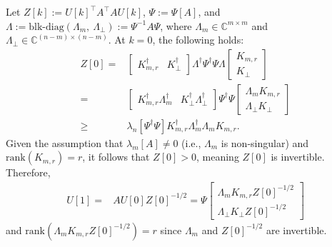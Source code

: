 \documentclass{ifacconf}
\begin{document}
\begin{pf}
Let $Z[k] := U[k]^{\top} A ^{\top} A U[k]$, $\Psi := \Psi [A]$, and $\Lambda := \mbox{blk-diag}( \Lambda _{m} ,\ \Lambda _{\perp} ) := \Psi ^{-1} A \Psi $, where $\Lambda _{m} \in \mathbb{C}^{m\times m} $ and $\Lambda _{\perp} \in \mathbb{C}^{(n-m) \times (n-m)}$. 
At $k=0$, the following holds:
\begin{align*}
    Z[0] =& \begin{bmatrix}
    K_{m,r} ^{\dagger} & K_{\perp}^{\dagger} 
    \end{bmatrix}
    \Lambda ^{\dagger} \Psi ^{\dagger} \Psi \Lambda 
    \begin{bmatrix}
    K_{m,r} \\ K_{\perp}
    \end{bmatrix}
    \\
    =& \begin{bmatrix}
    K_{m,r} ^{\dagger} \Lambda _{m}^{\dagger} & K_{\perp}^{\dagger} \Lambda _{\perp}^{\dagger}
    \end{bmatrix}
    \Psi ^{\dagger} \Psi 
    \begin{bmatrix}
    \Lambda _{m} K_{m,r} \\ \Lambda _{\perp}K_{\perp}
    \end{bmatrix}
    \\
    \geq &
    \lambda _{n}[ \Psi ^{\dagger} \Psi  ] K_{m,r} ^{\dagger} \Lambda _{m}^{\dagger} \Lambda _{m} K_{m,r}. 
\end{align*}
Given the assumption that $\lambda _{m}[A] \neq 0$ (i.e., $ \Lambda _{m} $ is non-singular) and $\mathrm{rank}(K_{m,r}) =r$, it follows that $Z[0] >0$, meaning $Z[0]$ is invertible. 
Therefore,
\begin{align*}
    U[1] =& A U[0] Z[0]^{-1/2}
    =
    \Psi \begin{bmatrix}
    \Lambda _{m} K_{m,r} Z[0]^{-1/2}
    \\ 
    \Lambda _{\perp}K_{\perp} Z[0]^{-1/2}
    \end{bmatrix}
\end{align*}
and $\mathrm{rank} (\Lambda _{m} K_{m,r} Z[0]^{-1/2}) =r$ since $\Lambda_m$ and $Z[0]^{-1/2}$ are invertible.


\end{pf}
\end{document}
